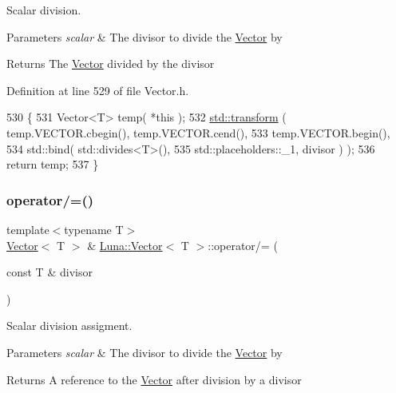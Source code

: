 Scalar division. 


\begin{DoxyParams}{Parameters}
{\em scalar} & The divisor to divide the \hyperlink{classLuna_1_1Vector}{Vector} by \\
\hline
\end{DoxyParams}
\begin{DoxyReturn}{Returns}
The \hyperlink{classLuna_1_1Vector}{Vector} divided by the divisor 
\end{DoxyReturn}


Definition at line 529 of file Vector.\+h.


\begin{DoxyCode}
530   \{
531     Vector<T> temp( *\textcolor{keyword}{this} );
532     \hyperlink{namespaceHeat__plot_aeaa6785bedcad63b4bd40e8cb1bad8a0}{std::transform} ( temp.VECTOR.cbegin(), temp.VECTOR.cend(),
533                      temp.VECTOR.begin(),
534                      std::bind( std::divides<T>(),
535                                 std::placeholders::\_1, divisor ) );
536     \textcolor{keywordflow}{return} temp;
537   \}
\end{DoxyCode}
\mbox{\label{classLuna_1_1Vector_a27dfb8d1b326a6bc7fd482fecb922f64}} 
\subsubsection{\texorpdfstring{operator/=()}{operator/=()}}
{\footnotesize\ttfamily template$<$typename T$>$ \\
\hyperlink{classLuna_1_1Vector}{Vector}$<$ T $>$ \& \hyperlink{classLuna_1_1Vector}{Luna\+::\+Vector}$<$ T $>$\+::operator/= (\begin{DoxyParamCaption}\item[{const T \&}]{divisor }\end{DoxyParamCaption})\hspace{0.3cm}{\ttfamily [inline]}}



Scalar division assigment. 


\begin{DoxyParams}{Parameters}
{\em scalar} & The divisor to divide the \hyperlink{classLuna_1_1Vector}{Vector} by \\
\hline
\end{DoxyParams}
\begin{DoxyReturn}{Returns}
A reference to the \hyperlink{classLuna_1_1Vector}{Vector} after division by a divisor 
\end{DoxyReturn}


